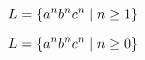 \begin{frame}{}
  
  \[
    L = \{a^nb^nc^n \mid n \ge 1\}
  \]
\end{frame}

\begin{frame}{}
  \begin{center}
    \[
      L = \{a^{n}b^{n}c^{n} \mid n \ge 0\}
    \]
    \href{https://en.wikipedia.org/wiki/Pumping\_lemma\_for\_context-free\_languages}{
      }

    \vspace{0.30cm}
  \end{center}
\end{frame}
